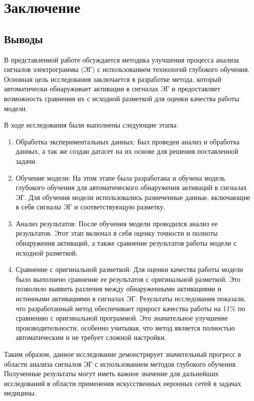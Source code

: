 \chapter{Заключение}
\section{Выводы}

В представленной работе обсуждается методика улучшения процесса анализа
сигналов электрограммы (ЭГ) с использованием технологий глубокого обучения.
Основная цель исследования заключается в разработке метода, который
автоматически обнаруживает активации в сигналах ЭГ и предоставляет возможность
сравнения их с исходной разметкой для оценки качества работы модели.

В ходе исследования были выполнены следующие этапы:

\begin{enumerate}

	\item Обработка экспериментальных данных: Был проведен анализ и обработка
	данных, а так же создан датасет на их основе для решения поставленной
	задачи.

	\item Обучение модели: На этом этапе была разработана и обучена модель глубокого
	обучения для автоматического обнаружения активаций в сигналах ЭГ. Для обучения
	модели использовались размеченные данные, включающие в себя сигналы ЭГ и
	соответствующую разметку.

	\item Анализ результатов: После обучения модели проводился
	анализ ее результатов. Этот этап включал в себя оценку точности и полноты
	обнаружения активаций, а также сравнение результатов работы модели с исходной
	разметкой.

	\item Сравнение с оригинальной разметкой: Для оценки качества работы
	модели было выполнено сравнение ее результатов с оригинальной разметкой. Это
	позволило выявить различия между обнаруженными активациями и истинными
	активациями в сигналах ЭГ. Результаты исследования показали, что разработанный
	метод обеспечивает прирост качества работы на 11\% по сравнению с оригинальной
	программой. Это значительное улучшение производительности, особенно учитывая,
	что метод является полностью автоматическим и не требует сложной настройки.

\end{enumerate}

Таким образом, данное исследование демонстрирует значительный прогресс в
области анализа сигналов ЭГ с использованием методов глубокого обучения.
Полученные результаты могут иметь важное значение для дальнейших исследований в
области применения искусственных неронных сетей в задачах медицины.

